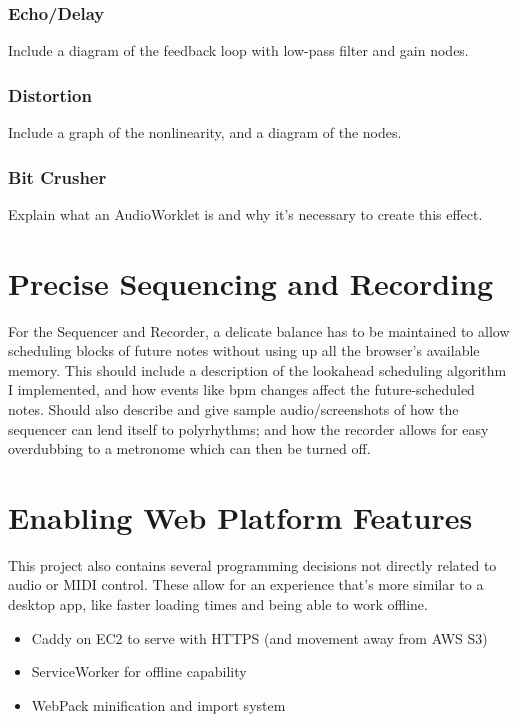 \documentclass[11pt, a4paper]{article}
\begin{document}
\subsubsection{Echo/Delay}
Include a diagram of the feedback loop with low-pass filter and gain nodes.
\subsubsection{Distortion}
Include a graph of the nonlinearity, and a diagram of the nodes.
\subsubsection{Bit Crusher}
Explain what an AudioWorklet is and why it's necessary to create this effect.
\pagebreak


\section{Precise Sequencing and Recording}
For the Sequencer and Recorder, a delicate balance has to be maintained to allow scheduling blocks of future notes without using up all the browser's available memory. This should include a description of the lookahead scheduling algorithm I implemented, and how events like bpm changes affect the future-scheduled notes. Should also describe and give sample audio/screenshots of how the sequencer can lend itself to polyrhythms; and how the recorder allows for easy overdubbing to a metronome which can then be turned off.
\pagebreak


\section{Enabling Web Platform Features}
This project also contains several programming decisions not directly related to audio or MIDI control. These allow for an experience that's more similar to a desktop app, like faster loading times and being able to work offline.
\begin{itemize}
	\item Caddy on EC2 to serve with HTTPS (and movement away from AWS S3)
	\item ServiceWorker for offline capability
	\item WebPack minification and import system
\end{itemize}

\pagebreak
\end{document}
